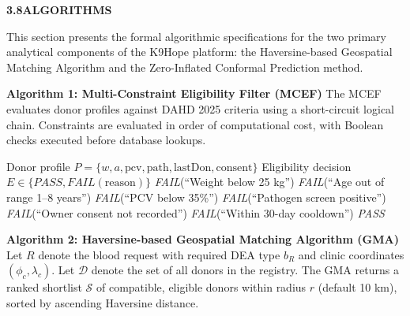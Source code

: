 \documentclass[12pt,a4paper]{article}
\begin{document}
\vspace{1.5em}
\noindent\textbf{3.8\quad ALGORITHMS}
\vspace{0.6em}

\noindent This section presents the formal algorithmic specifications for the two primary analytical components of the K9Hope platform: the Haversine-based Geospatial Matching Algorithm and the Zero-Inflated Conformal Prediction method.

\noindent\textbf{Algorithm 1: Multi-Constraint Eligibility Filter (MCEF)}
\noindent The MCEF evaluates donor profiles against DAHD 2025 criteria using a short-circuit logical chain. Constraints are evaluated in order of computational cost, with Boolean checks executed before database lookups.

\begin{algorithm}[H]
\caption{Multi-Constraint Eligibility Filter (MCEF)}
\begin{algorithmic}[1]
\Require Donor profile $P = \{w, a, \text{pcv}, \text{path}, \text{lastDon}, \text{consent}\}$
\Ensure Eligibility decision $E \in \{\textit{PASS}, \textit{FAIL}(\text{reason})\}$
 \Return \textit{FAIL}(``Weight below 25 kg'') \EndIf
{} \Return \textit{FAIL}(``Age out of range 1--8 years'') \EndIf
{} \Return \textit{FAIL}(``PCV below 35\%'') \EndIf
{} \Return \textit{FAIL}(``Pathogen screen positive'') \EndIf
{} \Return \textit{FAIL}(``Owner consent not recorded'') \EndIf
{} \Return \textit{FAIL}(``Within 30-day cooldown'') \EndIf
\State \Return \textit{PASS}
\end{algorithmic}
\end{algorithm}

\noindent\textbf{Algorithm 2: Haversine-based Geospatial Matching Algorithm (GMA)}
\noindent Let $R$ denote the blood request with required DEA type $b_R$ and clinic coordinates $(\phi_c, \lambda_c)$. Let $\mathcal{D}$ denote the set of all donors in the registry. The GMA returns a ranked shortlist $\mathcal{S}$ of compatible, eligible donors within radius $r$ (default 10 km), sorted by ascending Haversine distance.
\end{document}
